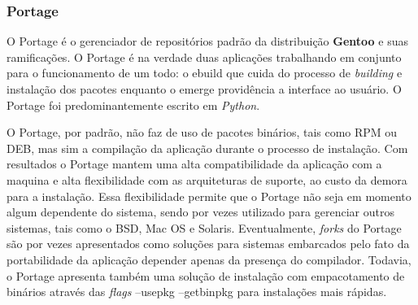 \subsubsection{Portage} %
\label{ssub:emerge}

O Portage é  o gerenciador de repositórios padrão da distribuição \textbf{Gentoo} e suas ramificações. O Portage é na verdade duas aplicações trabalhando em conjunto para o funcionamento de um todo: o {\code ebuild} que cuida do processo de \textit{building} e instalação dos pacotes enquanto o {\code emerge} providência a interface ao usuário. O Portage foi predominantemente escrito em \textit{Python}.

O Portage, por padrão, não faz de uso de pacotes binários, tais como RPM ou DEB, mas sim a compilação da aplicação durante o processo de instalação. Com resultados o Portage mantem uma alta compatibilidade da aplicação com a maquina e alta flexibilidade com as arquiteturas de suporte, ao custo da demora para a instalação.
Essa flexibilidade permite que o Portage não seja em momento algum dependente do sistema, sendo por vezes utilizado para gerenciar outros sistemas, tais como o BSD, Mac OS e Solaris.
Eventualmente, \textit{forks} do Portage são por vezes apresentados como soluções para sistemas embarcados pelo fato da portabilidade da aplicação depender apenas da presença do compilador. Todavia, o Portage apresenta também uma solução de instalação com empacotamento de binários através das \textit{flags} {\code --usepkg --getbinpkg} \cite{gentoo-doc}  para instalações mais rápidas.
